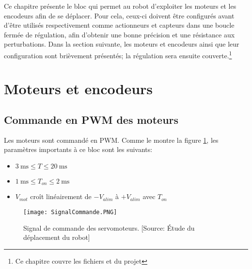 Ce chapitre présente le bloc qui permet au robot d'exploiter les moteurs et les encodeurs afin de se déplacer. Pour cela, ceux-ci doivent être configurés avant d'être utilisés respectivement comme actionneurs et capteurs dans une boucle fermée de régulation, afin d'obtenir une bonne précision et une résistance aux perturbations. Dans la section suivante, les moteurs et encodeurs ainsi que leur configuration sont brièvement présentés; la régulation sera ensuite couverte.\footnote{Ce chapitre couvre les fichiers  et  du projet }

\section{Moteurs et encodeurs}
\subsection{Commande en PWM des moteurs}
Les moteurs sont commandé en PWM. Comme le montre la figure \ref{fig:SignalServo}, les paramètres importants à ce bloc sont les suivants:
\begin{itemize}
  \item $\SI{3}{\milli\second} \leq T \leq \SI{20}{\milli\second}$
  \item $ \SI{1}{\milli\second} \leq T_{on} \leq \SI{2}{\milli\second}$
  \item $V_{mot}$ croît linéairement de $-V_{alim}$ à $+V_{alim}$ avec $T_{on}$
\end{itemize}
\begin{figure}[htbp]
\vspace{1.5em}
\centering
\texttt{[image: SignalCommande.PNG]}
\caption{\label{fig:SignalServo}Signal de commande des servomoteurs. [Source: \'Etude du déplacement du robot]}
\end{figure}

